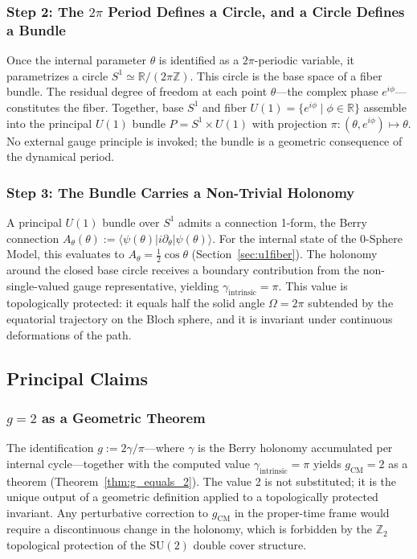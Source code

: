 \documentclass[%
 reprint,
 amsmath,amssymb,
 aps,
 prb,
]{revtex4-2}
\numberwithin{equation}{section}
\theoremstyle{definition}
\theoremstyle{remark}
\newcommand{\Sone}{S^1}
\newcommand{\Uone}{U(1)}
\begin{document}
\subsubsection{Step 2: The $2\pi$ Period Defines a Circle, and a Circle Defines a Bundle}

Once the internal parameter $\theta$ is identified as a $2\pi$-periodic variable, it parametrizes a circle $\Sone \simeq \mathbb{R}/(2\pi\mathbb{Z})$. This circle is the base space of a fiber bundle. The residual degree of freedom at each point $\theta$---the complex phase $e^{i\phi}$---constitutes the fiber. Together, base $\Sone$ and fiber $\Uone = \{e^{i\phi} \mid \phi \in \mathbb{R}\}$ assemble into the principal $\Uone$ bundle $P = \Sone \times \Uone$ with projection $\pi : (\theta, e^{i\phi}) \mapsto \theta$. No external gauge principle is invoked; the bundle is a geometric consequence of the dynamical period.

\subsubsection{Step 3: The Bundle Carries a Non-Trivial Holonomy}

A principal $\Uone$ bundle over $\Sone$ admits a connection 1-form, the Berry connection $A_\theta(\theta) := \langle \psi(\theta) | i\partial_\theta | \psi(\theta) \rangle$. For the internal state of the 0-Sphere Model, this evaluates to $A_\theta = \frac{1}{2}\cos\theta$ (Section~\ref{sec:u1fiber}). The holonomy around the closed base circle receives a boundary contribution from the non-single-valued gauge representative, yielding $\gamma_{\text{intrinsic}} = \pi$. This value is topologically protected: it equals half the solid angle $\Omega = 2\pi$ subtended by the equatorial trajectory on the Bloch sphere, and it is invariant under continuous deformations of the path.

\subsection{Principal Claims}
\label{sec:claims}

\subsubsection{\texorpdfstring{$g = 2$}{g = 2} as a Geometric Theorem}

The identification $g := 2\gamma/\pi$---where $\gamma$ is the Berry holonomy accumulated per internal cycle---together with the computed value $\gamma_{\text{intrinsic}} = \pi$ yields $g_{\text{CM}} = 2$ as a theorem (Theorem~\ref{thm:g_equals_2}). The value 2 is not substituted; it is the unique output of a geometric definition applied to a topologically protected invariant. Any perturbative correction to $g_{\text{CM}}$ in the proper-time frame would require a discontinuous change in the holonomy, which is forbidden by the $\mathbb{Z}_2$ topological protection of the $\mathrm{SU}(2)$ double cover structure.
\end{document}
